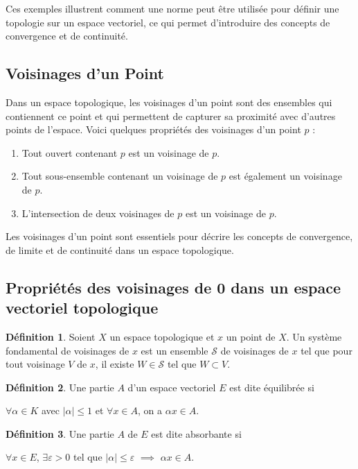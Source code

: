 \documentclass{article}
\theoremstyle{definition}
\newtheorem{definition}{Définition}[section]
\theoremstyle{plain}
\begin{document}
Ces exemples illustrent comment une norme peut être utilisée pour définir une topologie sur un espace vectoriel, ce qui permet d'introduire des concepts de convergence et de continuité.

\subsection{Voisinages d'un Point}
Dans un espace topologique, les voisinages d'un point sont des ensembles qui contiennent ce point et qui permettent de capturer sa proximité avec d'autres points de l'espace. Voici quelques propriétés des voisinages d'un point $p$ :

\begin{enumerate}
    \item Tout ouvert contenant $p$ est un voisinage de $p$.
    \item Tout sous-ensemble contenant un voisinage de $p$ est également un voisinage de $p$.
    \item L'intersection de deux voisinages de $p$ est un voisinage de $p$.
\end{enumerate}

Les voisinages d'un point sont essentiels pour décrire les concepts de convergence, de limite et de continuité dans un espace topologique.

\subsection{Propriétés des voisinages de 0 dans un espace vectoriel topologique}

\begin{definition}
    Soient $X$ un espace topologique et $x$ un point de $X$. Un système fondamental de voisinages de $x$ est un ensemble $\mathcal{S}$ de voisinages de $x$ tel que pour tout voisinage $V$ de $x$, il existe $W \in \mathcal{S}$ tel que $W \subset V$.
\end{definition}

\begin{definition}
    Une partie $A$ d'un espace vectoriel $E$ est dite équilibrée si
    
    $\forall \alpha \in K$ avec $|\alpha| \leq 1$ et $\forall x \in A$, on a $\alpha x \in A$. 
\end{definition}

\begin{definition}
    Une partie $A$ de $E$ est dite absorbante si
    
    $\forall x \in E$, $\exists \varepsilon > 0$ tel que $|\alpha| \leq \varepsilon$ $\implies$ $\alpha x \in A$.
\end{definition}
\end{document}
